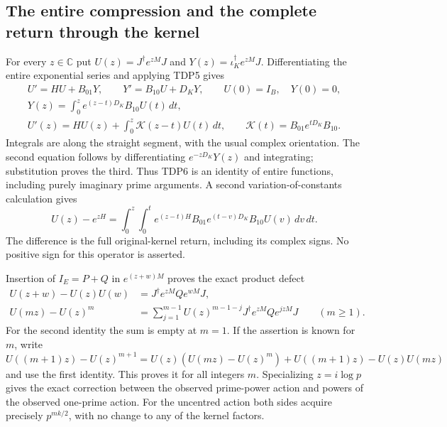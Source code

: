 \documentclass[11pt]{article}
\begin{document}
\subsection{The entire compression and the complete return through the kernel}

For every $z\in\mathbb C$ put $U(z)=J^\dagger e^{zM}J$ and
$Y(z)=\iota_K^\dagger e^{zM}J$. Differentiating the entire exponential
series and applying TDP5 gives
\begin{equation}\tag{TDP6}
\begin{gathered}
U'=HU+B_{01}Y,\qquad Y'=B_{10}U+D_KY,\qquad U(0)=I_B,\quad Y(0)=0,\\
Y(z)=\int_0^z e^{(z-t)D_K}B_{10}U(t)\,dt,\\
U'(z)=HU(z)+\int_0^z\mathcal K(z-t)U(t)\,dt,
\qquad \mathcal K(t)=B_{01}e^{tD_K}B_{10}.
\end{gathered}
\end{equation}
Integrals are along the straight segment, with the usual complex
orientation. The second equation follows by differentiating
$e^{-zD_K}Y(z)$ and integrating; substitution proves the third.
Thus TDP6 is an identity of entire functions, including purely imaginary
prime arguments. A second variation-of-constants calculation gives
\begin{equation}\tag{TDP7}
U(z)-e^{zH}=
\int_0^z\!\int_0^t
 e^{(z-t)H}B_{01}e^{(t-v)D_K}B_{10}U(v)\,dv\,dt.
\end{equation}
The difference is the full original-kernel return, including its complex
signs. No positive sign for this operator is asserted.

Insertion of $I_E=P+Q$ in $e^{(z+w)M}$ proves the exact product defect
\begin{equation}\tag{TDP8}
\begin{aligned}
U(z+w)-U(z)U(w)
 &=J^\dagger e^{zM}Qe^{wM}J,\\
U(mz)-U(z)^m
 &=\sum_{j=1}^{m-1}U(z)^{m-1-j}
   J^\dagger e^{zM}Qe^{jzM}J\qquad(m\ge1).
\end{aligned}
\end{equation}
For the second identity the sum is empty at $m=1$. If the assertion is
known for $m$, write
$U((m+1)z)-U(z)^{m+1}=U(z)(U(mz)-U(z)^m)
+U((m+1)z)-U(z)U(mz)$ and use the first identity. This proves it for
all integers $m$. Specializing $z=i\log p$ gives the exact correction
between the observed prime-power action and powers of the observed
one-prime action. For the uncentred action both sides acquire precisely
$p^{mk/2}$, with no change to any of the kernel factors.
\end{document}
